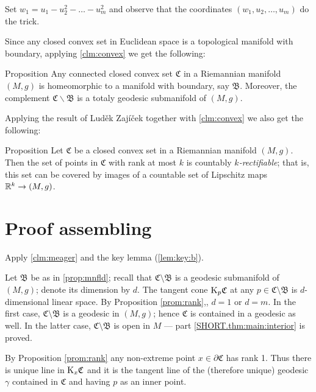\documentclass[a4paper,10pt]{article}
\begin{document}
Set $w_1=u_1-u_2^2-\dots-u_m^2$ and observe that the coordinates
$(w_1,u_2,\dots, u_m)$ do the trick.
\qeds

Since any closed convex set in Euclidean space is a topological manifold with boundary, applying \ref{clm:convex} we get the following:

\begin{thm}{Proposition}\label{prop:mnfld}
Any connected closed convex set $\mathfrak{C}$ in a Riemannian manifold $(M,g)$ is homeomorphic to a manifold with boundary, say $\mathfrak{B}$.
Moreover, the complement $\mathfrak{C}\backslash \mathfrak{B}$ is a totaly geodesic submanifold of $(M,g)$.
\end{thm}

Applying the result of Luděk 
Zajíček \cite{zajicek} 
together with \ref{clm:convex} we also get the following:

\begin{thm}{Proposition}\label{prop:rectifiable}
Let $\mathfrak{C}$ be a closed convex set in a Riemannian manifold $(M,g)$.
Then the set of points in $\mathfrak{C}$ with rank at most $k$ is countably \emph{$k$-rectifiable};
that is, this set can be  covered by images of a countable set of Lipschitz maps $\mathbb{R}^k\to (M,g)$.
\end{thm}

\section{Proof assembling}

Apply \ref{clm:meager} and the key lemma \mbox{(\ref{lem:key:b})}.


Let $\mathfrak B$ be as in \ref{prop:mnfld}; recall that $\mathfrak C\setminus \mathfrak B$ is a geodesic submanifold of $(M,g)$;
denote its dimension by $d$.
The tangent cone $\mathrm{K}_p \mathfrak C$ at any $p \in \mathfrak C\setminus \mathfrak B$ is $d$-dimensional linear space.
By Proposition \ref{prom:rank},, $d=1$ or $d=m$.
In the first case, $\mathfrak C\setminus \mathfrak B$ is a geodesic in $(M,g)$;
hence $\mathfrak C$ is contained in a geodesic as well.
In the latter case, $\mathfrak C\setminus \mathfrak B$ is open in $M$ --- part \ref{SHORT.thm:main:interior} is proved.

By Proposition \ref{prom:rank} any non-extreme point $x\in \partial \mathfrak C$ has rank 1.
Thus there is unique line in $\mathrm{K}_x\mathfrak C$ and it is the tangent line of the (therefore unique) geodesic $\gamma$ contained in $\mathfrak C$ and having $p$ as an inner point. 
\end{document}
